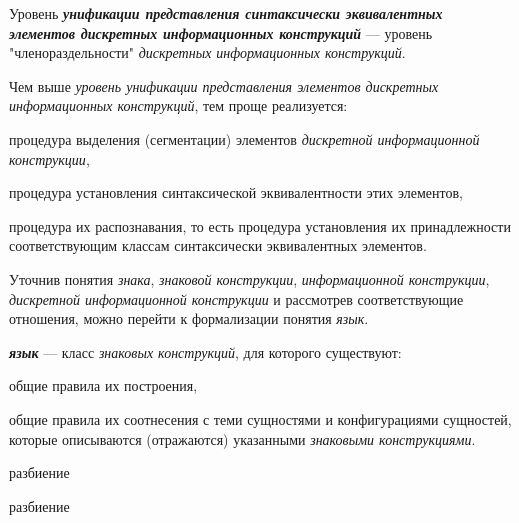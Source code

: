 Уровень \textbf{\textit{унификации представления синтаксически эквивалентных элементов дискретных информационных конструкций\scnsupergroupsign}} --- уровень "членораздельности"{} \textit{дискретных информационных конструкций}.

Чем выше \textit{уровень унификации представления элементов дискретных информационных конструкций}, тем проще реализуется:
\begin{textitemize}
    \item процедура выделения (сегментации) элементов \textit{дискретной информационной конструкции},
    \item процедура установления синтаксической эквивалентности этих элементов,
    \item процедура их распознавания, то есть процедура установления их принадлежности соответствующим классам синтаксически эквивалентных элементов.
\end{textitemize}

Уточнив понятия \textit{знака}, \textit{знаковой конструкции}, \textit{информационной конструкции}, \textit{дискретной информационной конструкции} и рассмотрев соответствующие отношения, можно перейти к формализации понятия \textit{язык}.

\textbf{\textit{язык}} --- класс \textit{знаковых конструкций}, для которого существуют:
\begin{textitemize}
    \item общие правила их построения,
    \item общие правила их соотнесения с теми сущностями и конфигурациями сущностей, которые описываются (отражаются) указанными \textit{знаковыми конструкциями}.
\end{textitemize}

\begin{SCn}

    \begin{scnrelfromset}{разбиение}
        \begin{scnindent}
	        \begin{scnrelfromset}{разбиение}
    	    \end{scnrelfromset}
	    \end{scnindent}
    \end{scnrelfromset}

\end{SCn}

